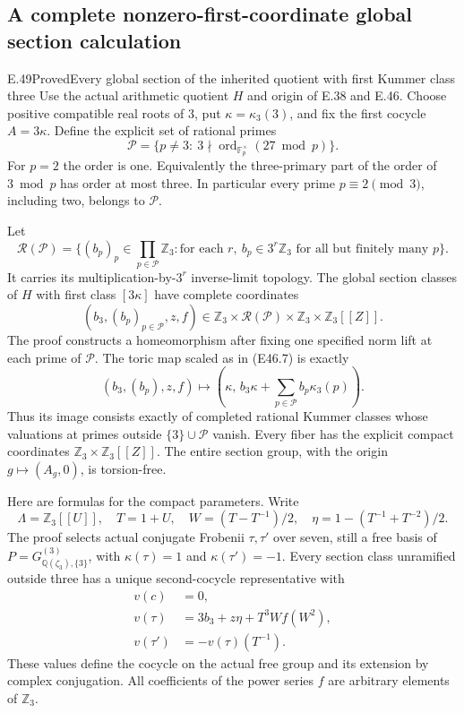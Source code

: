 \subsection{A complete nonzero-first-coordinate global section calculation}

\begin{statement}{E.49}{Proved}{Every global section of the inherited quotient with first Kummer class three}
Use the actual arithmetic quotient $H$ and origin
of E.38 and E.46. Choose positive compatible real
roots of $3$, put $\kappa=\kappa_3(3)$, and fix
the first cocycle $A=3\kappa$. Define the explicit
set of rational primes
\[
 \mathscr P=\{p\ne3:\ 3\nmid
          \operatorname{ord}_{\mathbb F_p^\times}(27\bmod p)\}.
 \tag{E49.1}
\]
For $p=2$ the order is one. Equivalently the
three-primary part of the order of $3\bmod p$
has order at most three. In particular every
prime $p\equiv2\pmod3$, including two, belongs
to $\mathscr P$.

Let
\[
 \mathcal R(\mathscr P)=
 \{(b_p)_p\in\prod_{p\in\mathscr P}\mathbb Z_3:
        \text{for each }r,\ b_p\in3^r\mathbb Z_3
                     \text{ for all but finitely many }p\}.
 \tag{E49.2}
\]
It carries its multiplication-by-$3^r$
inverse-limit topology. The global section
classes of $H$ with first class $[3\kappa]$
have complete coordinates
\[
 \boxed{\quad
   (b_3,(b_p)_{p\in\mathscr P},z,f)
   \in \mathbb Z_3\times\mathcal R(\mathscr P)
                  \times\mathbb Z_3\times\mathbb Z_3[[Z]] .
 \quad}
 \tag{E49.3}
\]
The proof constructs a homeomorphism after
fixing one specified norm lift at each prime
of $\mathscr P$. The toric map scaled as in
(E46.7) is exactly
\[
 (b_3,(b_p),z,f)\longmapsto
 \left(\kappa,\,
         b_3\kappa+\sum_{p\in\mathscr P}b_p\kappa_3(p)\right).
 \tag{E49.4}
\]
Thus its image consists exactly of completed
rational Kummer classes whose valuations at
primes outside $\{3\}\cup\mathscr P$ vanish.
Every fiber has the explicit compact
coordinates $\mathbb Z_3\times\mathbb Z_3[[Z]]$.
The entire section group, with the origin
$g\mapsto(A_g,0)$, is torsion-free.

Here are formulas for the compact parameters.
Write
\[
 \Lambda=\mathbb Z_3[[U]],\quad T=1+U,\quad
 W=(T-T^{-1})/2,\quad
 \eta=1-(T^{-1}+T^{-2})/2.
 \tag{E49.5}
\]
The proof selects actual conjugate Frobenii
$\tau,\tau'$ over seven, still a free basis
of $P=G_{\mathbb Q(\zeta_3),\{3\}}^{(3)}$,
with $\kappa(\tau)=1$ and
$\kappa(\tau')=-1$. Every section class
unramified outside three has a unique
second-cocycle representative with
\[
 \begin{split}
 v(c)&=0,\\
 v(\tau)&=3b_3+z\eta+T^3W f(W^2),\\
 v(\tau')&=-v(\tau)(T^{-1}).
 \end{split}
 \tag{E49.6}
\]
These values define the cocycle on the
actual free group and its extension by
complex conjugation. All coefficients
of the power series $f$ are arbitrary
elements of $\mathbb Z_3$.


\end{statement}
